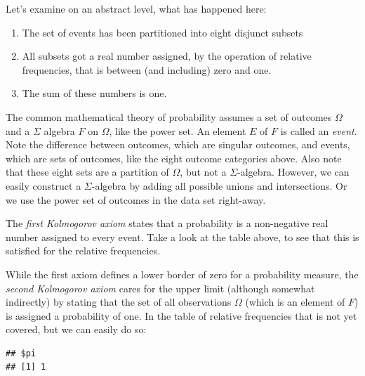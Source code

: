 \documentclass[]{svmono}
\newenvironment{Shaded}{\begin{snugshade}}{\end{snugshade}}
\newcommand{\KeywordTok}[1]{\textcolor[rgb]{0.13,0.29,0.53}{\textbf{#1}}}
\newcommand{\DataTypeTok}[1]{\textcolor[rgb]{0.13,0.29,0.53}{#1}}
\newcommand{\StringTok}[1]{\textcolor[rgb]{0.31,0.60,0.02}{#1}}
\newcommand{\CommentTok}[1]{\textcolor[rgb]{0.56,0.35,0.01}{\textit{#1}}}
\newcommand{\OperatorTok}[1]{\textcolor[rgb]{0.81,0.36,0.00}{\textbf{#1}}}
\newcommand{\NormalTok}[1]{#1}
\providecommand{\tightlist}{%
  \setlength{\itemsep}{0pt}\setlength{\parskip}{0pt}}
\begin{document}
Let's examine on an abstract level, what has happened here:

\begin{enumerate}
\def\labelenumi{\arabic{enumi}.}
\tightlist
\item
  The set of events has been partitioned into eight disjunct subsets
\item
  All subsets got a real number assigned, by the operation of relative
  frequencies, that is between (and including) zero and one.
\item
  The sum of these numbers is one.
\end{enumerate}

The common mathematical theory of probability assumes a set of outcomes
\(\Omega\) and a \(\Sigma\) algebra \(F\) on \(\Omega\), like the power
set. An element \(E\) of \(F\) is called an \emph{event}. Note the
difference between outcomes, which are singular outcomes, and events,
which are sets of outcomes, like the eight outcome categories above.
Also note that these eight sets are a partition of \(\Omega\), but not a
\(\Sigma\)-algebra. However, we can easily construct a
\(\Sigma\)-algebra by adding all possible unions and intersections. Or
we use the power set of outcomes in the data set right-away.

The \emph{first Kolmogorov axiom} states that a probability is a
non-negative real number assigned to every event. Take a look at the
table above, to see that this is satisfied for the relative frequencies.

While the first axiom defines a lower border of zero for a probability
measure, the \emph{second Kolmogorov axiom} cares for the upper limit
(although somewhat indirectly) by stating that the set of all
observations \(\Omega\) (which is an element of \(F\)) is assigned a
probability of one. In the table of relative frequencies that is not yet
covered, but we can easily do so:

\begin{Shaded}
\end{Shaded}

\begin{verbatim}
## $pi
## [1] 1
\end{verbatim}
\end{document}
